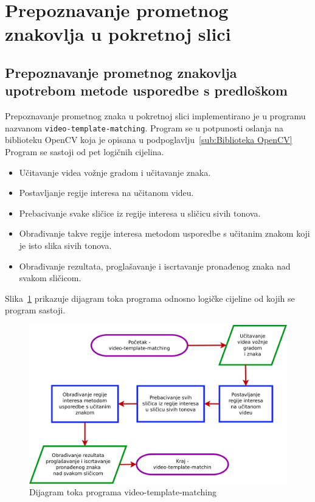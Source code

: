 \newpage
\setcounter{figure}{0}

\section{Prepoznavanje prometnog znakovlja u pokretnoj slici} %
\label{sec:Prepoznavanje prometnog}

\subsection{Prepoznavanje prometnog znakovlja upotrebom metode usporedbe
s predloškom} %
\label{sub:Prepoznavanje prometnog znakovlja upotrebom metode uspore}

Prepoznavanje prometnog znaka u pokretnoj slici implementirano je u
programu nazvanom \texttt{video-template-matching}. Program se u
potpunosti oslanja na biblioteku OpenCV koja je opisana u
podpoglavlju~\ref{sub:Biblioteka OpenCV} Program se sastoji od pet
logičnih cijelina.

\begin{itemize}
    \item Učitavanje videa vožnje gradom i učitavanje znaka.
    \item Postavljanje regije interesa na učitanom videu.
    \item Prebacivanje svake sličice iz regije interesa u sličicu sivih
        tonova. 
    \item Obrađivanje takve regije interesa metodom usporedbe s učitanim
        znakom koji je isto slika sivih tonova.
    \item Obrađivanje rezultata, proglašavanje i iscrtavanje pronađenog
        znaka nad svakom sličicom.
\end{itemize}

Slika~\ref{fig:dijagramtoka.pdf} prikazuje dijagram toka programa
odnosno logičke cijeline od kojih se program sastoji.

\begin{figure}[h]
\centering
\includegraphics[scale=0.4]{figures/dijagramtoka.pdf}
\caption{Dijagram toka programa video-template-matching}
\label{fig:dijagramtoka.pdf}
\end{figure}



